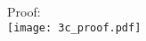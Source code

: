 \documentclass[10pt]{article}
\begin{document}
\begin{enumerate}
\begin{enumerate}
    Proof: \\
    \texttt{[image: 3c\_proof.pdf]}

  \end{enumerate}

\end{enumerate}
\end{document}
